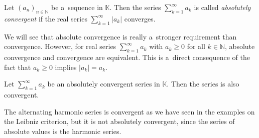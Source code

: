 


\begin{Definition}
  Let $(a_n)_{n\in\mathbb{N}}$ be a~sequence in $\mathbb{K}$. Then the series $\sum_{k=1}^\infty a_k$
is called \emph{absolutely convergent} if the real series
$\sum_{k=1}^\infty |a_k|$
converges.
\end{Definition}
%
\begin{Remark}{}
We will see that absolute convergence is really a~stronger requirement than convergence. However, for real series $\sum_{k=1}^\infty a_k$ with $a_k\geq0$ for all $k\in\mathbb{N}$, absolute convergence and convergence are equivalent. This is a~direct consequence of the fact that $a_k\geq0$ implies $|a_k|=a_k$.
\end{Remark}


\begin{Theorem}
  Let $\sum_{k=1}^\infty a_k$  be an absolutely convergent series in $\mathbb{K}$. Then the series is also convergent.
\end{Theorem}
\begin{example}
The alternating harmonic series is convergent as we have seen in the examples on the Leibniz criterion, but it is not absolutely convergent, since the series of absolute values is the harmonic series.
\end{example}

